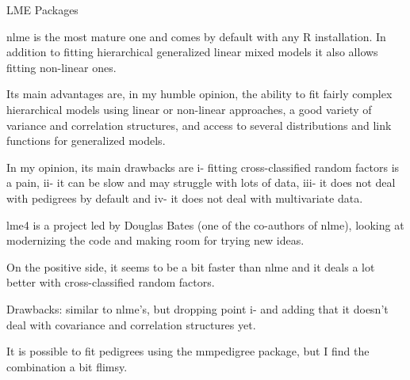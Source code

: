 LME Packages

nlme is the most mature one and comes by default with any R installation. 
In addition to fitting hierarchical generalized linear mixed models it also allows 
fitting non-linear ones. 

Its main advantages are, in my humble opinion, the ability to fit fairly complex hierarchical 
models using linear or non-linear approaches, a good  variety of variance and correlation 
structures, and access to several distributions and link functions for generalized models. 

In my opinion, its main drawbacks are 
i- fitting cross-classified random factors is a pain, 
ii- it can be slow and may struggle with lots of data, 
iii- it does not deal with pedigrees by default and 
iv- it does not deal with multivariate data.

lme4 is a project led by Douglas Bates (one of the co-authors of nlme), 
looking at modernizing the code and making room for trying new ideas. 

On the positive side, it seems to be a bit faster than nlme and it deals a lot
better with cross-classified random factors. 

Drawbacks: similar to nlme’s, but dropping point 
i- and adding that it doesn’t deal with covariance and correlation structures yet. 

It is possible to fit pedigrees using the mmpedigree package, but I find the combination a bit flimsy.
